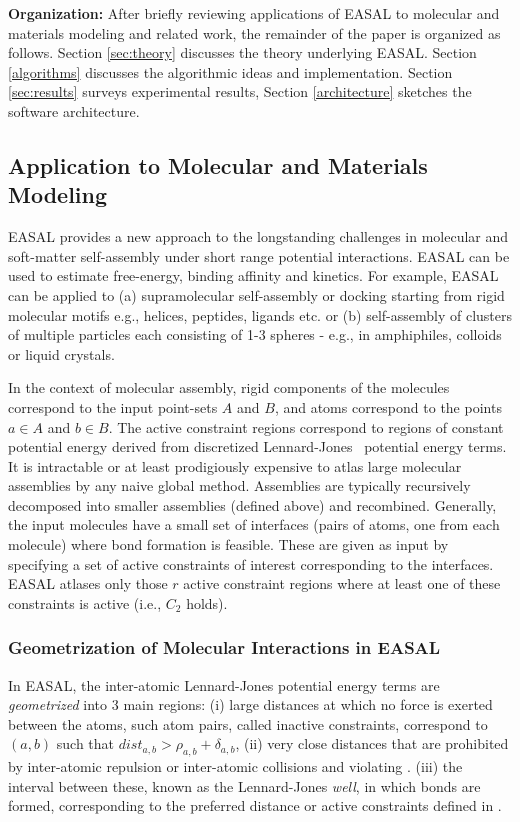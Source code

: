 \noindent\textbf{Organization:} 
After briefly reviewing applications of EASAL to molecular and materials
modeling and related work, the remainder of the paper is organized as follows.
Section \ref{sec:theory} discusses the theory underlying EASAL. Section
\ref{algorithms} discusses the algorithmic ideas and implementation. Section
\ref{sec:results} surveys experimental results, Section \ref{architecture}
sketches the software architecture.

\subsection{Application to Molecular and Materials Modeling} 

EASAL provides a new approach to the longstanding challenges in molecular and
soft-matter self-assembly under short range potential interactions.  EASAL can
be used to estimate free-energy, binding affinity and kinetics. For example, EASAL
can be applied to (a) supramolecular self-assembly or docking starting from rigid
molecular motifs e.g., helices, peptides, ligands etc. or (b) self-assembly of
clusters of multiple particles each consisting of 1-3 spheres - e.g., in
amphiphiles, colloids or liquid crystals. 

In the context of molecular assembly, rigid components of the molecules
correspond to the input point-sets $A$ and $B$, and atoms correspond to the
points $a\in A$ and $b\in B$. The active constraint regions correspond to
regions of constant potential energy derived from discretized
Lennard-Jones~\cite{Jones463} potential energy terms. It is intractable or at
least prodigiously expensive to atlas large molecular assemblies by any naive
global method. Assemblies are typically recursively decomposed into smaller
assemblies (defined above) and recombined. Generally, the input molecules have
a small set of interfaces (pairs of atoms, one from each molecule) where bond
formation is feasible. These are given as input by specifying a set of active
constraints of interest corresponding to the interfaces. EASAL atlases only
those $r$ active constraint regions where at least one of these constraints is
active (i.e., $C_2$ holds).


\subsubsection{Geometrization of Molecular Interactions in EASAL} 
\label{sec:geometrization}
In EASAL, the inter-atomic Lennard-Jones potential energy terms are
\emph{geometrized} into 3 main regions: (i) large distances at which no force
is exerted between the atoms, such atom pairs, called inactive constraints,
correspond to $(a,b)$ such that $dist_{a,b} > \rho_{a,b} + \delta_{a,b}$, (ii)
very close distances that are prohibited by inter-atomic repulsion or
inter-atomic collisions and violating \cone. (iii) the interval between these,
known as the Lennard-Jones \emph{well}, in which bonds are formed,
corresponding to the preferred distance or active constraints defined in \ctwo.

